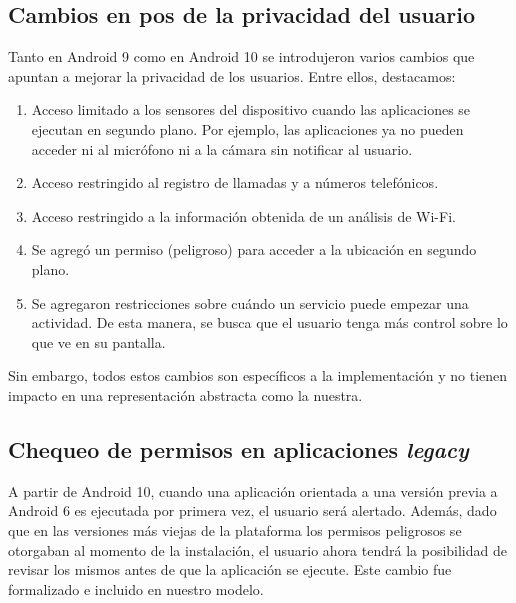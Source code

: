\subsection{Cambios en pos de la privacidad del usuario}
Tanto en Android 9 como en Android 10 se introdujeron varios cambios que apuntan a mejorar la
privacidad de los usuarios. Entre ellos, destacamos:
\begin{enumerate}
    \item Acceso limitado a los sensores del dispositivo cuando las aplicaciones se ejecutan en
          segundo plano. Por ejemplo, las aplicaciones ya no pueden acceder ni al micrófono ni a la
          cámara sin notificar al usuario.
    \item Acceso restringido al registro de llamadas y a números telefónicos.
    \item Acceso restringido a la información obtenida de un análisis de Wi-Fi.
    \item Se agregó un permiso (peligroso) para acceder a la ubicación en segundo plano.
    \item Se agregaron restricciones sobre cuándo un servicio puede empezar una actividad. De esta
          manera, se busca que el usuario tenga más control sobre lo que ve en su pantalla.
\end{enumerate}

Sin embargo, todos estos cambios son específicos a la implementación y no tienen impacto en una
representación abstracta como la nuestra.

\subsection{Chequeo de permisos en aplicaciones \textit{legacy}}
\label{subsection:recent-changes:legacy-apps}

A partir de Android 10, cuando una aplicación orientada a una versión previa a Android 6 es
ejecutada por primera vez, el usuario será alertado. Además, dado que en las versiones más viejas de
la plataforma los permisos peligrosos se otorgaban al momento de la instalación, el usuario ahora
tendrá la posibilidad de revisar los mismos antes de que la aplicación se ejecute. Este cambio
fue formalizado e incluido en nuestro modelo.


